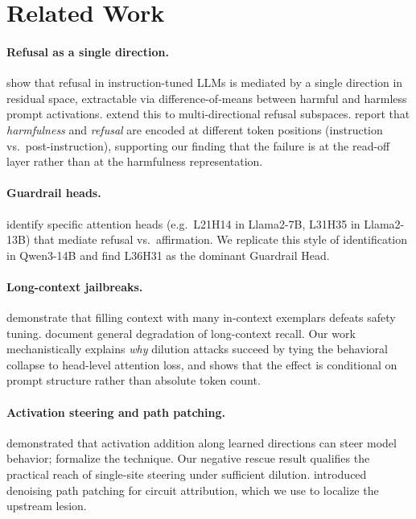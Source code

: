 \documentclass[10pt,twocolumn]{article}
\newcommand{\model}{Qwen3-14B}
\theoremstyle{definition}
\begin{document}
\section{Related Work}
\label{sec:related}

\paragraph{Refusal as a single direction.}
\citet{arditi2024refusal} show that refusal in instruction-tuned LLMs is
mediated by a single direction in residual space, extractable via
difference-of-means between harmful and harmless prompt activations.
\citet{wollschlaeger2025geometry} extend this to multi-directional
refusal subspaces. \citet{zhao2025separately} report that
\emph{harmfulness} and \emph{refusal} are encoded at different token
positions (instruction vs.\ post-instruction), supporting our finding
that the failure is at the read-off layer rather than at the
harmfulness representation.

\paragraph{Guardrail heads.}
\citet{jin2024jailbreaklens} identify specific attention heads (e.g.\
L21H14 in Llama2-7B, L31H35 in Llama2-13B) that mediate refusal vs.\
affirmation. We replicate this style of identification in \model{} and
find L36H31 as the dominant Guardrail Head.

\paragraph{Long-context jailbreaks.}
\citet{anil2024manyshot} demonstrate that filling context with many
in-context exemplars defeats safety tuning. \citet{liu2024lostmiddle}
document general degradation of long-context recall. Our work
mechanistically explains \emph{why} dilution attacks succeed by tying
the behavioral collapse to head-level attention loss, and shows that
the effect is conditional on prompt structure rather than absolute
token count.

\paragraph{Activation steering and path patching.}
\citet{turner2023activation} demonstrated that activation addition
along learned directions can steer model behavior;
\citet{panickssery2024steering} formalize the technique. Our negative
rescue result qualifies the practical reach of single-site steering
under sufficient dilution. \citet{goldowskydill2023patching} introduced
denoising path patching for circuit attribution, which we use to
localize the upstream lesion.
\end{document}

